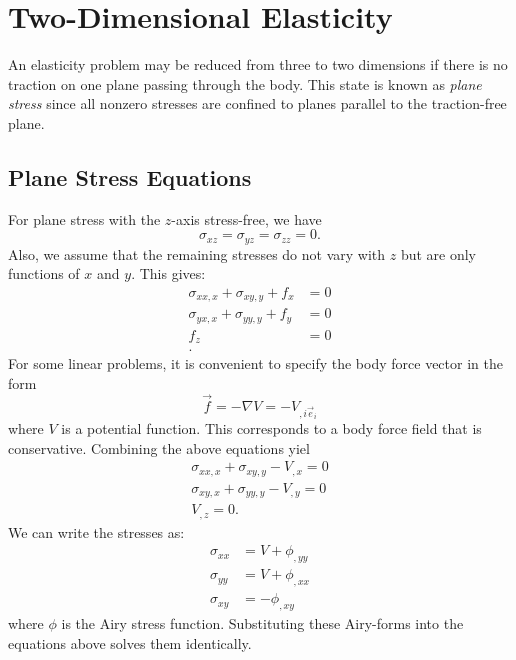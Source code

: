 
\section{Two-Dimensional Elasticity}

An elasticity problem may be reduced from three to two dimensions if there is no traction on one plane passing through the body.
This state is known as \textit{plane stress} since all nonzero stresses are confined to planes parallel to the traction-free plane.


\subsection{Plane Stress Equations}
For plane stress with the $z$-axis stress-free, we have
\begin{equation*}
  \sigma_{xz} = \sigma_{yz} = \sigma_{zz} = 0
.\end{equation*}
Also, we assume that the remaining stresses do not vary with $z$ but are only functions of $x$ and $y$.
This gives:
\begin{align*}
  \sigma_{x x, x} + \sigma_{xy, y} + f_x &= 0 \\
  \sigma_{yx, x} + \sigma_{yy,y} + f_y &= 0 \\
  f_z &= 0 \\
.\end{align*}
For some linear problems, it is convenient to specify the body force vector in the form
\begin{equation*}
  \Vec{f} = - \nabla V = - V_{,i \Vec{e}_i}
\end{equation*}
where $V$ is a potential function.
This corresponds to a body force field that is conservative.
Combining the above equations yiel
\begin{gather*}
  \sigma_{x x, x} + \sigma_{xy,y} - V_{,x} = 0 \\
  \sigma_{xy, x} + \sigma_{yy,y} - V_{,y} = 0 \\
  V_{,z} = 0
.\end{gather*}
We can write the stresses as:
\begin{align*}
  \sigma_{x x} &= V + \phi_{, yy} \\
  \sigma_{yy} &= V + \phi_{,x x} \\
  \sigma_{xy} &= - \phi_{,xy}
\end{align*}
where $\phi$ is the Airy stress function.
Substituting these Airy-forms into the equations above solves them identically.


